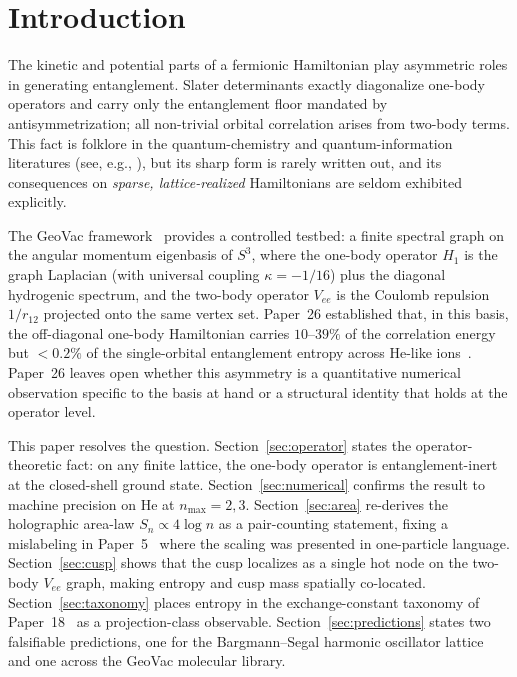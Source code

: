 \documentclass[twocolumn,pra,amsmath,amssymb,superscriptaddress]{revtex4-2}
\begin{document}
\maketitle

\section{Introduction}
\label{sec:intro}

The kinetic and potential parts of a fermionic Hamiltonian play
asymmetric roles in generating entanglement.  Slater determinants
exactly diagonalize one-body operators and carry only the
entanglement floor mandated by antisymmetrization; all
non-trivial orbital correlation arises from two-body terms.  This
fact is folklore in the quantum-chemistry and quantum-information
literatures (see, e.g., \cite{Peschel2003,LiHaldane2008}), but its
sharp form is rarely written out, and its consequences on
\emph{sparse, lattice-realized} Hamiltonians are seldom exhibited
explicitly.

The GeoVac framework~\cite{GeoVac_Paper0,GeoVac_Paper7,
GeoVac_Paper14} provides a controlled testbed: a finite spectral
graph on the angular momentum eigenbasis of $S^{3}$, where the
one-body operator $H_1$ is the graph Laplacian (with universal
coupling $\kappa = -1/16$) plus the diagonal hydrogenic spectrum,
and the two-body operator $V_{ee}$ is the Coulomb repulsion
$1/r_{12}$ projected onto the same vertex set.  Paper~26
established that, in this basis, the off-diagonal one-body
Hamiltonian carries $10$--$39\%$ of the correlation energy but
$<0.2\%$ of the single-orbital entanglement entropy across
He-like ions~\cite{GeoVac_Paper26}.  Paper~26 leaves open whether
this asymmetry is a quantitative numerical observation specific
to the basis at hand or a structural identity that holds at the
operator level.

This paper resolves the question.  Section~\ref{sec:operator}
states the operator-theoretic fact: on any finite lattice, the
one-body operator is entanglement-inert at the closed-shell
ground state.  Section~\ref{sec:numerical} confirms the result
to machine precision on He at $n_{\max}=2,3$.
Section~\ref{sec:area} re-derives the holographic area-law
$S_n \propto 4\log n$ as a pair-counting statement, fixing a
mislabeling in Paper~5~\cite{GeoVac_Paper5} where the scaling was
presented in one-particle language.  Section~\ref{sec:cusp}
shows that the cusp localizes as a single hot node on the
two-body $V_{ee}$ graph, making entropy and cusp mass spatially
co-located.  Section~\ref{sec:taxonomy} places entropy in the
exchange-constant taxonomy of Paper~18~\cite{GeoVac_Paper18} as
a projection-class observable.  Section~\ref{sec:predictions}
states two falsifiable predictions, one for the Bargmann--Segal
harmonic oscillator lattice~\cite{GeoVac_Paper24} and one
across the GeoVac molecular library.
\end{document}
